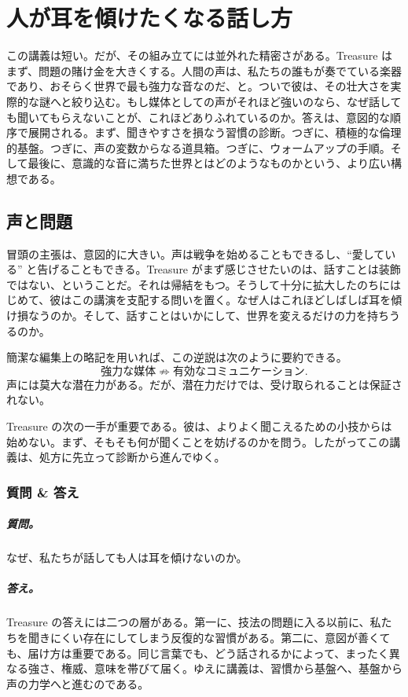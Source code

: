 \chapter{人が耳を傾けたくなる話し方}

この講義は短い。だが、その組み立てには並外れた精密さがある。Treasure はまず、問題の賭け金を大きくする。人間の声は、私たちの誰もが奏でている楽器であり、おそらく世界で最も強力な音なのだ、と。ついで彼は、その壮大さを実際的な謎へと絞り込む。もし媒体としての声がそれほど強いのなら、なぜ話しても聞いてもらえないことが、これほどありふれているのか。答えは、意図的な順序で展開される。まず、聞きやすさを損なう習慣の診断。つぎに、積極的な倫理的基盤。つぎに、声の変数からなる道具箱。つぎに、ウォームアップの手順。そして最後に、意識的な音に満ちた世界とはどのようなものかという、より広い構想である。

\section{声と問題}

冒頭の主張は、意図的に大きい。声は戦争を始めることもできるし、``愛している'' と告げることもできる。Treasure がまず感じさせたいのは、話すことは装飾ではない、ということだ。それは帰結をもつ。そうして十分に拡大したのちにはじめて、彼はこの講演を支配する問いを置く。なぜ人はこれほどしばしば耳を傾け損なうのか。そして、話すことはいかにして、世界を変えるだけの力を持ちうるのか。

簡潔な編集上の略記を用いれば、この逆説は次のように要約できる。
\begin{equation}
\text{強力な媒体} \not\Rightarrow \text{有効なコミュニケーション}.
\end{equation}
声には莫大な潜在力がある。だが、潜在力だけでは、受け取られることは保証されない。

Treasure の次の一手が重要である。彼は、よりよく聞こえるための小技からは始めない。まず、そもそも何が聞くことを妨げるのかを問う。したがってこの講義は、処方に先立って診断から進んでゆく。

\subsection{質問 \& 答え}

\paragraph{質問。} なぜ、私たちが話しても人は耳を傾けないのか。

\paragraph{答え。} Treasure の答えには二つの層がある。第一に、技法の問題に入る以前に、私たちを聞きにくい存在にしてしまう反復的な習慣がある。第二に、意図が善くても、届け方は重要である。同じ言葉でも、どう話されるかによって、まったく異なる強さ、権威、意味を帯びて届く。ゆえに講義は、習慣から基盤へ、基盤から声の力学へと進むのである。

